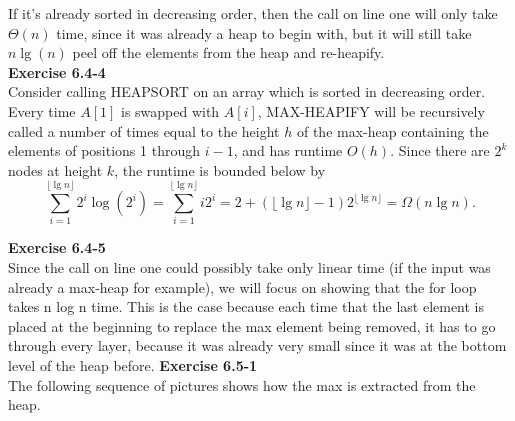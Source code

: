 \documentclass{article}
\begin{document}
If it's already sorted in decreasing order, then the call on line one will only take $\Theta(n)$ time, since it was already a heap to begin with, but it will still take $n\lg(n)$ peel off the elements from the heap and re-heapify. \\

\noindent\textbf{Exercise 6.4-4}\\

Consider calling HEAPSORT on an array which is sorted in decreasing order.  Every time $A[1]$ is swapped with $A[i]$, MAX-HEAPIFY will be recursively called a number of times equal to the height $h$ of the max-heap containing the elements of positions 1 through $i-1$, and has runtime $O(h)$.  Since there are $2^k$ nodes at height $k$, the runtime is bounded below by
\[ \sum_{i=1}^{\lfloor\lg n\rfloor} 2^i \log(2^i) =  \sum_{i=1}^{\lfloor\lg n\rfloor} i2^i = 2 + (\lfloor\lg n\rfloor - 1)2^{\lfloor\lg n\rfloor} = \Omega(n\lg n).\]



\noindent\textbf{Exercise 6.4-5}\\

Since the call on line one could possibly take only linear time (if the input was already a max-heap for example), we will focus on showing that the for loop takes n log n time. This is the case because each time that the last element is placed at the beginning to replace the max element being removed, it has to go through every layer, because it was already very small since it was at the bottom level of the heap before.
\noindent\textbf{Exercise 6.5-1}\\


The following sequence of pictures shows how the max is extracted from the heap.
\end{document}
